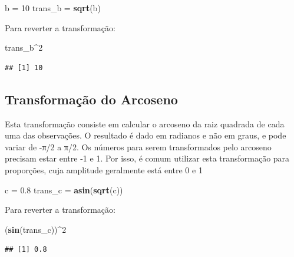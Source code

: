 \documentclass[
]{article}
\newenvironment{Shaded}{\begin{snugshade}}{\end{snugshade}}
\newcommand{\DecValTok}[1]{\textcolor[rgb]{0.00,0.00,0.81}{#1}}
\newcommand{\FloatTok}[1]{\textcolor[rgb]{0.00,0.00,0.81}{#1}}
\newcommand{\KeywordTok}[1]{\textcolor[rgb]{0.13,0.29,0.53}{\textbf{#1}}}
\newcommand{\NormalTok}[1]{#1}
\newcommand{\OperatorTok}[1]{\textcolor[rgb]{0.81,0.36,0.00}{\textbf{#1}}}
\newcommand{\StringTok}[1]{\textcolor[rgb]{0.31,0.60,0.02}{#1}}
\begin{document}
\begin{Shaded}
\begin{Highlighting}[]
\NormalTok{b =}\StringTok{ }\DecValTok{10}
\NormalTok{trans_b =}\StringTok{ }\KeywordTok{sqrt}\NormalTok{(b)}
\end{Highlighting}
\end{Shaded}

Para reverter a transformação:

\begin{Shaded}
\begin{Highlighting}[]
\NormalTok{trans_b}\OperatorTok{^}\DecValTok{2}
\end{Highlighting}
\end{Shaded}

\begin{verbatim}
## [1] 10
\end{verbatim}

\hypertarget{transformauxe7uxe3o-do-arcoseno}{%
\subsection{Transformação do Arcoseno}\label{transformauxe7uxe3o-do-arcoseno}}

Esta transformação consiste em calcular o arcoseno da raiz quadrada de cada uma das observações. O resultado é dado em radianos e não em graus, e pode variar de -π/2 a π/2. Os números para serem transformados pelo arcoseno precisam estar entre -1 e 1. Por isso, é comum utilizar esta transformação para proporções, cuja amplitude geralmente está entre 0 e 1

\begin{Shaded}
\begin{Highlighting}[]
\NormalTok{c =}\StringTok{ }\FloatTok{0.8}
\NormalTok{trans_c =}\StringTok{ }\KeywordTok{asin}\NormalTok{(}\KeywordTok{sqrt}\NormalTok{(c))}
\end{Highlighting}
\end{Shaded}

Para reverter a transformação:

\begin{Shaded}
\begin{Highlighting}[]
\NormalTok{(}\KeywordTok{sin}\NormalTok{(trans_c))}\OperatorTok{^}\DecValTok{2}
\end{Highlighting}
\end{Shaded}

\begin{verbatim}
## [1] 0.8
\end{verbatim}
\end{document}
